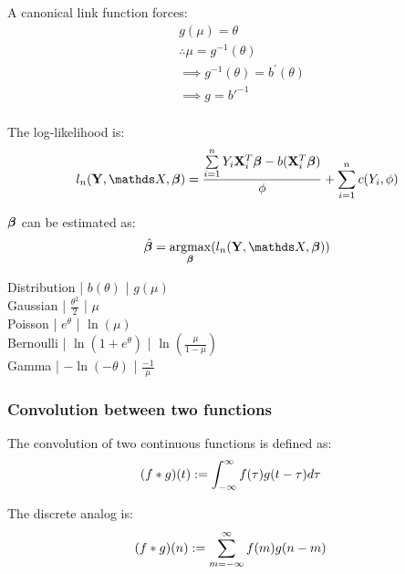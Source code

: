A canonical link function forces:
\begin {equation} \begin {split}
& g(\mu) = \theta \\
& \therefore \mu = g^{-1}(\theta) \\
& \implies g^{-1}(\theta) =  b^{'}(\theta) \\
& \implies g = b{'}^{-1} \\
\end {split} \end {equation}

The log-likelihood is:
\begin {equation} \begin {split} 
l_n(\vY, \mX, \vbeta) = \frac { \sum \limits_{i=1}^{n} Y_i \vX_i^T \vbeta -b(\vX_i^T \vbeta) } {\phi}  + \sum \limits_{i=1}^{n} c(Y_i, \phi) \\
\end {split} \end {equation}

$\bm{\beta}$ can be estimated as:
\begin {equation} \begin {split}
& \hat \vbeta = \argmax_{\vbeta} (l_n(\vY, \mX, \vbeta)) \\
\end {split} \end {equation}

 Distribution | $b(\theta)$ | $g(\mu)$ \\
 Gaussian | $ \frac {\theta^2} {2}$ | $ \mu $ \\
 Poisson | $ e^{\theta} $ | $ \ln(\mu) $ \\
 Bernoulli | $ \ln (1 + e^{\theta}) $ | $ \ln (\frac {\mu} {1 - \mu}) $ \\
 Gamma | $ -\ln (-\theta) $ | $ \frac {-1} {\mu} $ \\

\subsubsection {Convolution between two functions} 
The convolution of two continuous functions is defined as:
\begin{equation} \begin {split}
& ({f * g}) (t) := \int_{- \infty}^{\infty} f(\tau) g(t - \tau) d\tau
\end {split} \end{equation} 

The discrete analog is:
\begin{equation} \begin {split}
& ({f * g}) (n) := \sum_{m = -\infty}^{\infty} f(m) g(n - m)
\end {split} \end{equation}
